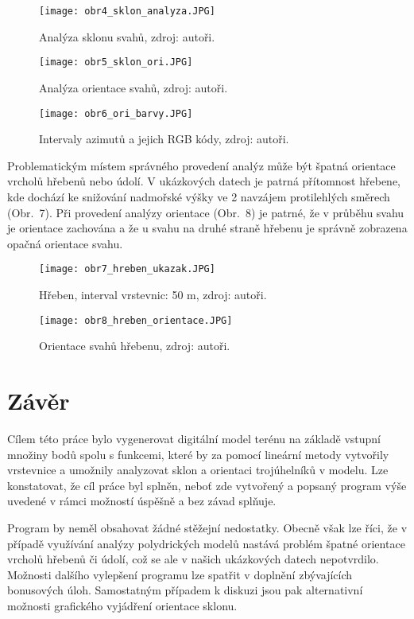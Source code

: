 \documentclass[a4paper,12pt]{article}
\begin{document}
{{{{{{{{{{{\begin{figure}[htbp]
    \text{ }
    
    \texttt{[image: obr4\_sklon\_analyza.JPG]}
    \centering
    \caption{Analýza sklonu svahů, zdroj: autoři.}
    \label{fig:obr4}
    \end{figure}
    
    \clearpage
    \begin{figure}[htbp]    
    \texttt{[image: obr5\_sklon\_ori.JPG]}
    \centering
    \caption{Analýza orientace svahů, zdroj: autoři.}
    \label{fig:obr5}
    \texttt{[image: obr6\_ori\_barvy.JPG]}
    \centering
    \caption{Intervaly azimutů a jejich RGB kódy, zdroj: autoři.}
    \label{fig:obr6}
    \end{figure} 

    Problematickým místem správného provedení analýz může být špatná orientace vrcholů hřebenů nebo údolí. V ukázkových datech je patrná přítomnost hřebene, kde dochází ke snižování nadmořské výšky ve 2 navzájem protilehlých směrech (Obr.~7). Při provedení analýzy orientace (Obr.~8) je patrné, že v průběhu svahu je orientace zachována a že u svahu na druhé straně hřebenu je správně zobrazena opačná orientace svahu.

    \begin{figure}[htbp]    
    \texttt{[image: obr7\_hreben\_ukazak.JPG]}
    \centering
    \caption{Hřeben, interval vrstevnic: 50 m, zdroj: autoři.}
    \label{fig:obr7}
    \texttt{[image: obr8\_hreben\_orientace.JPG]}
    \centering
    \caption{Orientace svahů hřebenu, zdroj: autoři.}
    \label{fig:obr8}
    \end{figure} 

    \newpage
    \section{Závěr}
    Cílem této práce bylo vygenerovat digitální model terénu na základě vstupní množiny bodů spolu s funkcemi, které by za pomocí lineární metody vytvořily vrstevnice a umožnily analyzovat sklon a orientaci trojúhelníků v modelu. Lze konstatovat, že cíl práce byl splněn, neboť zde vytvořený a popsaný program výše uvedené v rámci možností úspěšně a bez závad splňuje.
    
    Program by neměl obsahovat žádné stěžejní nedostatky. Obecně však lze říci, že v případě využívání analýzy polydrických modelů nastává problém špatné orientace vrcholů hřebenů či údolí, což se ale v našich ukázkových datech nepotvrdilo. Možnosti dalšího vylepšení programu lze spatřit v doplnění zbývajících bonusových úloh. Samostatným případem k diskuzi jsou pak alternativní možnosti grafického vyjádření orientace sklonu.







}}}}}}}}}}}
\end{document}
